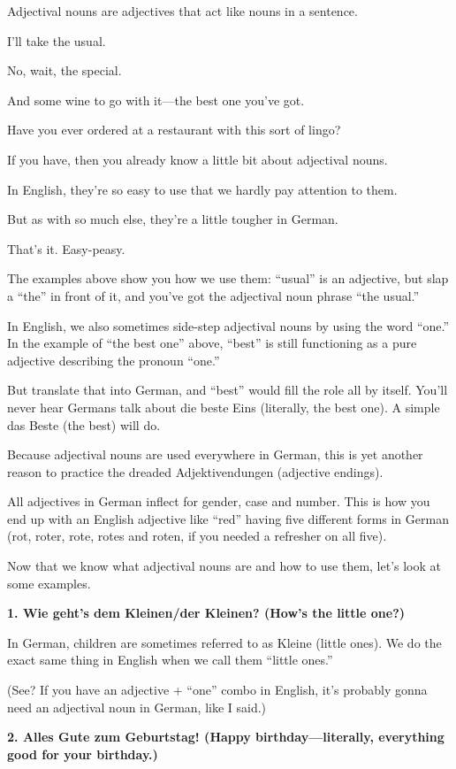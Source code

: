 \documentclass[a4paper,twocolumn,10pt]{article}
\begin{document}
Adjectival nouns are adjectives that act like nouns in a sentence.

I’ll take the usual.

No, wait, the special.

And some wine to go with it—the best one you’ve got.

Have you ever ordered at a restaurant with this sort of lingo?

If you have, then you already know a little bit about adjectival nouns.

In English, they’re so easy to use that we hardly pay attention to them.

But as with so much else, they’re a little tougher in German.

That’s it. Easy-peasy.

The examples above show you how we use them: “usual” is an adjective, but slap a “the” in front of it, and you’ve got the adjectival noun phrase “the usual.”

In English, we also sometimes side-step adjectival nouns by using the word “one.” In the example of “the best one” above, “best” is still functioning as a pure adjective describing the pronoun “one.”

But translate that into German, and “best” would fill the role all by itself. You’ll never hear Germans talk about die beste Eins (literally, the best one). A simple das Beste (the best) will do.

Because adjectival nouns are used everywhere in German, this is yet another reason to practice the dreaded Adjektivendungen (adjective endings).

All adjectives in German inflect for gender, case and number. This is how you end up with an English adjective like “red” having five different forms in German (rot, roter, rote, rotes and roten, if you needed a refresher on all five).

Now that we know what adjectival nouns are and how to use them, let’s look at some examples.

\textbf{1. Wie geht’s dem Kleinen/der Kleinen? (How’s the little one?)}

In German, children are sometimes referred to as Kleine (little ones). We do the exact same thing in English when we call them “little ones.”

(See? If you have an adjective + “one” combo in English, it’s probably gonna need an adjectival noun in German, like I said.)

\textbf{2. Alles Gute zum Geburtstag! (Happy birthday—literally, everything good for your birthday.)}
\end{document}
